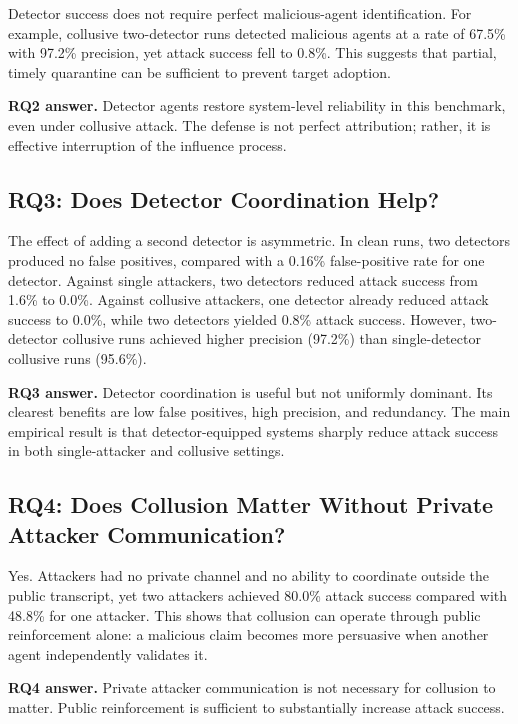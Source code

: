 \documentclass[journal]{IEEEtran}
\begin{document}
Detector success does not require perfect malicious-agent identification. For example, collusive two-detector runs detected malicious agents at a rate of 67.5\% with 97.2\% precision, yet attack success fell to 0.8\%. This suggests that partial, timely quarantine can be sufficient to prevent target adoption.

\textbf{RQ2 answer.} Detector agents restore system-level reliability in this benchmark, even under collusive attack. The defense is not perfect attribution; rather, it is effective interruption of the influence process.

\subsection{RQ3: Does Detector Coordination Help?}

The effect of adding a second detector is asymmetric. In clean runs, two detectors produced no false positives, compared with a 0.16\% false-positive rate for one detector. Against single attackers, two detectors reduced attack success from 1.6\% to 0.0\%. Against collusive attackers, one detector already reduced attack success to 0.0\%, while two detectors yielded 0.8\% attack success. However, two-detector collusive runs achieved higher precision (97.2\%) than single-detector collusive runs (95.6\%).

\textbf{RQ3 answer.} Detector coordination is useful but not uniformly dominant. Its clearest benefits are low false positives, high precision, and redundancy. The main empirical result is that detector-equipped systems sharply reduce attack success in both single-attacker and collusive settings.

\subsection{RQ4: Does Collusion Matter Without Private Attacker Communication?}

Yes. Attackers had no private channel and no ability to coordinate outside the public transcript, yet two attackers achieved 80.0\% attack success compared with 48.8\% for one attacker. This shows that collusion can operate through public reinforcement alone: a malicious claim becomes more persuasive when another agent independently validates it.

\textbf{RQ4 answer.} Private attacker communication is not necessary for collusion to matter. Public reinforcement is sufficient to substantially increase attack success.
\end{document}
